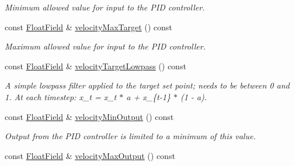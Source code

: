 \begin{DoxyCompactItemize}
\begin{DoxyCompactList}\small\item\em Minimum allowed value for input to the P\+ID controller. \end{DoxyCompactList}\item 
const \hyperlink{classhebi_1_1Info_1_1FloatField}{Float\+Field} \& \hyperlink{classhebi_1_1Info_1_1Settings_1_1Actuator_1_1VelocityGains_ae950927d151e9f553f96751174cae8ca}{velocity\+Max\+Target} () const \hypertarget{classhebi_1_1Info_1_1Settings_1_1Actuator_1_1VelocityGains_ae950927d151e9f553f96751174cae8ca}{}\label{classhebi_1_1Info_1_1Settings_1_1Actuator_1_1VelocityGains_ae950927d151e9f553f96751174cae8ca}

\begin{DoxyCompactList}\small\item\em Maximum allowed value for input to the P\+ID controller. \end{DoxyCompactList}\item 
const \hyperlink{classhebi_1_1Info_1_1FloatField}{Float\+Field} \& \hyperlink{classhebi_1_1Info_1_1Settings_1_1Actuator_1_1VelocityGains_aecb3ce015ca0ca41dccbedf4e4e4b2ba}{velocity\+Target\+Lowpass} () const \hypertarget{classhebi_1_1Info_1_1Settings_1_1Actuator_1_1VelocityGains_aecb3ce015ca0ca41dccbedf4e4e4b2ba}{}\label{classhebi_1_1Info_1_1Settings_1_1Actuator_1_1VelocityGains_aecb3ce015ca0ca41dccbedf4e4e4b2ba}

\begin{DoxyCompactList}\small\item\em A simple lowpass filter applied to the target set point; needs to be between 0 and 1. At each timestep\+: x\+\_\+t = x\+\_\+t $\ast$ a + x\+\_\+\{t-\/1\} $\ast$ (1 -\/ a). \end{DoxyCompactList}\item 
const \hyperlink{classhebi_1_1Info_1_1FloatField}{Float\+Field} \& \hyperlink{classhebi_1_1Info_1_1Settings_1_1Actuator_1_1VelocityGains_a35e163124b2b0c0d99061a83b23c7447}{velocity\+Min\+Output} () const \hypertarget{classhebi_1_1Info_1_1Settings_1_1Actuator_1_1VelocityGains_a35e163124b2b0c0d99061a83b23c7447}{}\label{classhebi_1_1Info_1_1Settings_1_1Actuator_1_1VelocityGains_a35e163124b2b0c0d99061a83b23c7447}

\begin{DoxyCompactList}\small\item\em Output from the P\+ID controller is limited to a minimum of this value. \end{DoxyCompactList}\item 
const \hyperlink{classhebi_1_1Info_1_1FloatField}{Float\+Field} \& \hyperlink{classhebi_1_1Info_1_1Settings_1_1Actuator_1_1VelocityGains_a541acff79a95eea03bfeda88bfc33b14}{velocity\+Max\+Output} () const \hypertarget{classhebi_1_1Info_1_1Settings_1_1Actuator_1_1VelocityGains_a541acff79a95eea03bfeda88bfc33b14}{}\label{classhebi_1_1Info_1_1Settings_1_1Actuator_1_1VelocityGains_a541acff79a95eea03bfeda88bfc33b14}


\end{DoxyCompactItemize}
